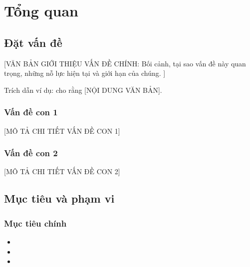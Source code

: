 
\chapter{Tổng quan}

\section{Đặt vấn đề}

[VĂN BẢN GIỚI THIỆU VẤN ĐỀ CHÍNH: Bối cảnh, tại sao vấn đề này quan trọng, 
những nỗ lực hiện tại và giới hạn của chúng. ]

Trích dẫn ví dụ: \textcite{tac_gia_sach_2024} cho rằng [NỘI DUNG VĂN BẢN].

\subsection{Vấn đề con 1}
[MÔ TẢ CHI TIẾT VẤN ĐỀ CON 1]

\subsection{Vấn đề con 2}
[MÔ TẢ CHI TIẾT VẤN ĐỀ CON 2]

\section{Mục tiêu và phạm vi}

\subsection{Mục tiêu chính}
\begin{itemize}
    \item [MỤC TIÊU 1]
    \item [MỤC TIÊU 2]
    \item [MỤC TIÊU 3]
\end{itemize}


